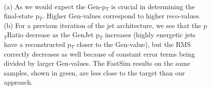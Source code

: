 \begin{figure}
    \myfloatalign
    \\
    \caption[Conditioning]{ (a) As we would expect the Gen-p$_T$ is crucial in determining the final-state p$_T$. Higher Gen-values correspond to higher reco-values. (b) For a previous iteration of the jet architecture, we see that the p$_T$Ratio decrease as the GenJet p$_T$ increases (highly energetic jets have a reconstructed p$_T$ closer to the Gen-value), but the RMS correctly decreases as well because of constant error terms being divided by larger Gen-values. The FastSim results on the same samples, shown in green, are less close to the target than our approach.}\label{fig:condit}
    
\end{figure}

